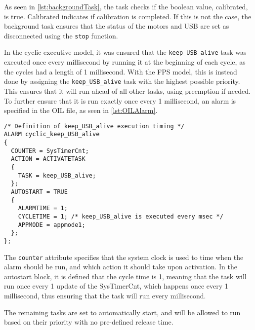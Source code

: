 As seen in \autoref{lst:backgroundTask}, the task checks if the boolean value, calibrated, is true.
Calibrated indicates if calibration is completed.
If this is not the case, the background task ensures that the status of the motors and USB are set as disconnected using the \texttt{stop} function.

In the cyclic executive model, it was ensured that the \texttt{keep\_USB\_alive} task was executed once every millisecond by running it at the beginning of each cycle, as the cycles had a length of 1 millisecond.
With the FPS model, this is instead done by assigning the \texttt{keep\_USB\_alive} task with the highest possible priority.
This ensures that it will run ahead of all other tasks, using preemption if needed.
To further ensure that it is run exactly once every 1 millisecond, an alarm is specified in the OIL file, as seen in \autoref{lst:OILAlarm}.

\begin{lstlisting}[language=CSharp,label={lst:OILAlarm},caption={Alarm in the OIL}]
/* Definition of keep_USB_alive execution timing */
ALARM cyclic_keep_USB_alive
{
  COUNTER = SysTimerCnt;
  ACTION = ACTIVATETASK
  {
    TASK = keep_USB_alive;
  };
  AUTOSTART = TRUE
  {
    ALARMTIME = 1;
    CYCLETIME = 1; /* keep_USB_alive is executed every msec */
    APPMODE = appmode1;
  };
};
\end{lstlisting}

The \texttt{counter} attribute specifies that the system clock is used to time when the alarm should be run, and which action it should take upon activation.
In the autostart block, it is defined that the cycle time is 1, meaning that the task will run once every 1 update of the SysTimerCnt, which happens once every 1 millisecond, thus ensuring that the task will run every millisecond.

The remaining tasks are set to automatically start, and will be allowed to run based on their priority with no pre-defined release time.
